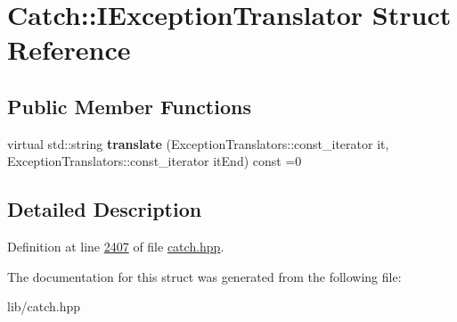 \hypertarget{structCatch_1_1IExceptionTranslator}{}\section{Catch\+::I\+Exception\+Translator Struct Reference}
\label{structCatch_1_1IExceptionTranslator}
\subsection*{Public Member Functions}
\begin{DoxyCompactItemize}
\item 
\mbox{\label{structCatch_1_1IExceptionTranslator_a2a554b96ed5ed411e7c796b6b42837a5}} 
virtual std\+::string {\bfseries translate} (Exception\+Translators\+::const\+\_\+iterator it, Exception\+Translators\+::const\+\_\+iterator it\+End) const =0
\end{DoxyCompactItemize}


\subsection{Detailed Description}


Definition at line \mbox{\hyperlink{catch_8hpp_source_l02407}{2407}} of file \mbox{\hyperlink{catch_8hpp_source}{catch.\+hpp}}.



The documentation for this struct was generated from the following file\+:\begin{DoxyCompactItemize}
\item 
lib/catch.\+hpp\end{DoxyCompactItemize}
